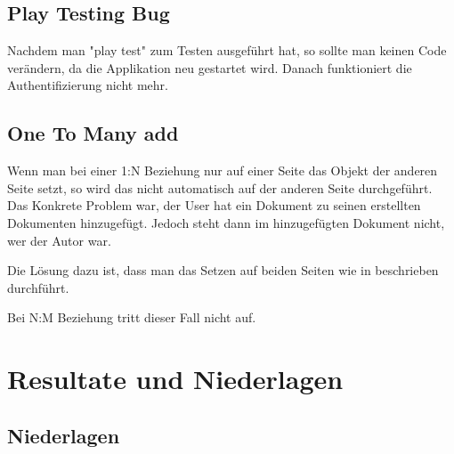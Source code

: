 \documentclass[11pt, a4paper]{article}
\begin{document}
\subsection{Play Testing Bug}
Nachdem man "play test" zum Testen ausgeführt hat, so sollte man keinen Code verändern, da die Applikation neu gestartet wird. Danach funktioniert die Authentifizierung nicht mehr.
\subsection{One To Many add}
Wenn man bei einer 1:N Beziehung nur auf einer Seite das Objekt der anderen Seite setzt, so wird das nicht automatisch auf der anderen Seite durchgeführt. Das Konkrete Problem war, der User hat ein Dokument zu seinen erstellten Dokumenten hinzugefügt. Jedoch steht dann im hinzugefügten Dokument nicht, wer der Autor war.

Die Lösung dazu ist, dass man das Setzen auf beiden Seiten wie in %
beschrieben durchführt.

Bei N:M Beziehung tritt dieser Fall nicht auf.

\section{Resultate und Niederlagen}
\subsection{Niederlagen}
{}

\end{document}
